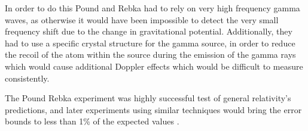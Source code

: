 In order to do this Pound and Rebka had to rely on very high frequency gamma waves, as otherwise it would have been impossible to detect the very small frequency shift due to the change in gravitational potential. Additionally, they had to use a specific crystal structure for the gamma source, in order to reduce the recoil of the atom within the source during the emission of the gamma rays which would cause additional Doppler effects which would be difficult to measure consistently.

The Pound Rebka experiment was highly successful test of general relativity's predictions, and later experiments using similar techniques would bring the error bounds to less than 1\% of the expected values \cite{lrr-2006-3}.
